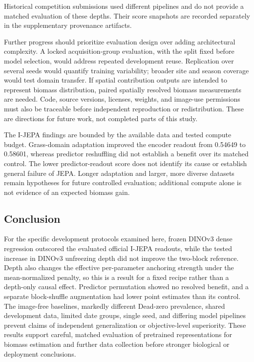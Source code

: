 \documentclass[pdflatex,a4paper,sn-nature]{sn-jnl}
\begin{document}
Historical competition submissions used different pipelines and do not provide a matched evaluation of these depths. Their score snapshots are recorded separately in the supplementary provenance artifacts.


Further progress should prioritize evaluation design over adding architectural complexity. A locked acquisition-group evaluation, with the split fixed before model selection, would address repeated development reuse. Replication over several seeds would quantify training variability; broader site and season coverage would test domain transfer. If spatial contribution outputs are intended to represent biomass distribution, paired spatially resolved biomass measurements are needed. Code, source versions, licenses, weights, and image-use permissions must also be traceable before independent reproduction or redistribution. These are directions for future work, not completed parts of this study.

The I-JEPA findings are bounded by the available data and tested compute budget. Grass-domain adaptation improved the encoder readout from 0.54649 to 0.58601, whereas predictor reshuffling did not establish a benefit over its matched control. The lower predictor-readout score does not identify its cause or establish general failure of JEPA. Longer adaptation and larger, more diverse datasets remain hypotheses for future controlled evaluation; additional compute alone is not evidence of an expected biomass gain.

\subsection{Conclusion}
For the specific development protocols examined here, frozen DINOv3 dense regression outscored the evaluated official I-JEPA readouts, while the tested increase in DINOv3 unfreezing depth did not improve the two-block reference. Depth also changes the effective per-parameter anchoring strength under the mean-normalized penalty, so this is a result for a fixed recipe rather than a depth-only causal effect. Predictor permutation showed no resolved benefit, and a separate block-shuffle augmentation had lower point estimates than its control. The image-free baselines, markedly different Dead-zero prevalence, shared development data, limited date groups, single seed, and differing model pipelines prevent claims of independent generalization or objective-level superiority. These results support careful, matched evaluation of pretrained representations for biomass estimation and further data collection before stronger biological or deployment conclusions.
\end{document}

